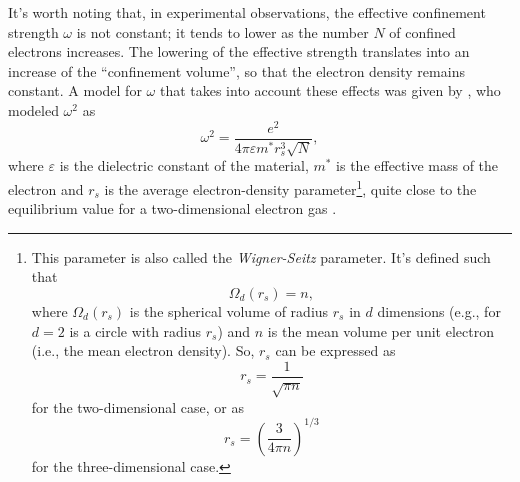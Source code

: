 It's worth noting that, in experimental observations, the effective confinement strength $\omega$ is not constant; it tends to lower as the number $N$ of confined electrons increases. The lowering of the effective strength translates into an increase of the ``confinement volume'', so that the electron density remains constant. A model for $\omega$ that takes into account these effects was given by \cite{Koskinen1997}, who modeled $\omega^2$ as
\begin{equation}
	\omega^2 = \frac{e^2}{4\pi\varepsilon m^*r_s^3\sqrt{N}},
\end{equation}
where $\varepsilon$ is the dielectric constant of the material, $m^*$ is the effective mass of the electron and $r_s$ is the average electron-density parameter\footnote{
	This parameter is also called the \emph{Wigner-Seitz} parameter. It's defined such that
	\begin{equation*}
		\Omega_d(r_s) = n,
	\end{equation*}
	where $\Omega_d(r_s)$ is the spherical volume of radius $r_s$ in $d$ dimensions (e.g., for $d=2$ is a circle with radius $r_s$) and $n$ is the mean volume per unit electron (i.e., the mean electron density). So, $r_s$ can be expressed as
	\begin{equation*}
		r_s = \frac{1}{\sqrt{\pi n}}
	\end{equation*}
	for the two-dimensional case, or as
	\begin{equation*}
		r_s = \left(\frac{3}{4\pi n}\right)^{1/3}
	\end{equation*}
	for the three-dimensional case.
},
quite close to the equilibrium value  for a two-dimensional electron gas \citep[see][]{Reimann2002}.
